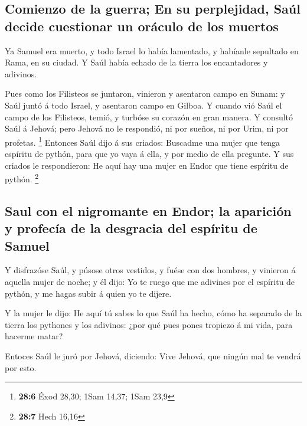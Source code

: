 \hypertarget{comienzo-de-la-guerra-en-su-perplejidad-sauxfal-decide-cuestionar-un-oruxe1culo-de-los-muertos}{%
\subsection{Comienzo de la guerra; En su perplejidad, Saúl decide
cuestionar un oráculo de los
muertos}\label{comienzo-de-la-guerra-en-su-perplejidad-sauxfal-decide-cuestionar-un-oruxe1culo-de-los-muertos}}

 Ya Samuel era muerto, y todo Israel lo había lamentado, y
habíanle sepultado en Rama, en su ciudad. Y Saúl había echado de la
tierra los encantadores y adivinos.

 Pues como los Filisteos se juntaron, vinieron y asentaron
campo en Sunam: y Saúl juntó á todo Israel, y asentaron campo en Gilboa.
 Y cuando vió Saúl el campo de los Filisteos, temió, y
turbóse su corazón en gran manera.  Y consultó Saúl á
Jehová; pero Jehová no le respondió, ni por sueños, ni por Urim, ni por
profetas. \footnote{\textbf{28:6} Éxod 28,30; 1Sam 14,37; 1Sam 23,9}
 Entonces Saúl dijo á sus criados: Buscadme una mujer que
tenga espíritu de pythón, para que yo vaya á ella, y por medio de ella
pregunte. Y sus criados le respondieron: He aquí hay una mujer en Endor
que tiene espíritu de pythón. \footnote{\textbf{28:7} Hech 16,16}

\hypertarget{saul-con-el-nigromante-en-endor-la-apariciuxf3n-y-profecuxeda-de-la-desgracia-del-espuxedritu-de-samuel}{%
\subsection{Saul con el nigromante en Endor; la aparición y profecía de
la desgracia del espíritu de
Samuel}\label{saul-con-el-nigromante-en-endor-la-apariciuxf3n-y-profecuxeda-de-la-desgracia-del-espuxedritu-de-samuel}}

 Y disfrazóse Saúl, y púsose otros vestidos, y fuése con dos
hombres, y vinieron á aquella mujer de noche; y él dijo: Yo te ruego que
me adivines por el espíritu de pythón, y me hagas subir á quien yo te
dijere.

 Y la mujer le dijo: He aquí tú sabes lo que Saúl ha hecho,
cómo ha separado de la tierra los pythones y los adivinos: ¿por qué pues
pones tropiezo á mi vida, para hacerme matar?

 Entoces Saúl le juró por Jehová, diciendo: Vive Jehová,
que ningún mal te vendrá por esto.

